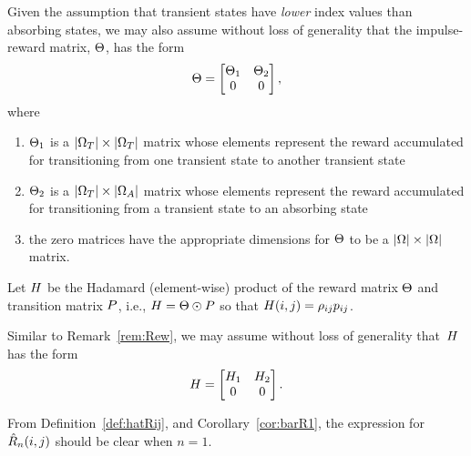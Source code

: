 \begin{remark}
	\label{rem:Rew}
	Given the assumption that transient states have \emph{lower} index values than absorbing states, we may also assume without loss of generality that the impulse-reward matrix, $\Theta$, has the form 
	\begin{equation}
	\label{eq:Rew_sub}
		\Theta = 
			\begin{bmatrix}
				\Theta_{1} & \Theta_{2} \\ 
				0 & 0
			\end{bmatrix},
	\end{equation}
	where 
	\begin{enumerate}
		\item $\Theta_{1}$ is a $|\Omega_{T}| \times |\Omega_{T}|$ matrix whose elements represent the reward accumulated for transitioning from one transient state to another transient state
		\item $\Theta_{2}$ is a $|\Omega_{T}| \times |\Omega_{A}|$ matrix whose elements represent the reward accumulated for transitioning from a transient state to an absorbing state
		\item the zero matrices have the appropriate dimensions for $\Theta$ to be a $|\Omega| \times |\Omega|$ matrix.
	\end{enumerate}
\end{remark}

\begin{mydef}
	\label{def:HtransRew}
	Let $H$ be the Hadamard (element-wise) product of the reward matrix $\Theta$ and transition matrix $P$, i.e., $H = \Theta \odot P$ so that $H(i, j) = \rho_{ij}p_{ij}$.
\end{mydef}

\begin{remark}
	\label{rem:HtransRew}
	Similar to Remark~\ref{rem:Rew}, we may assume without loss of generality that~$H$ has the form 
	\begin{equation}
	\label{eq:HtransRew_sub}
		H = 
			\begin{bmatrix}
				H_{1} & H_{2} \\ 
				0 & 0
			\end{bmatrix}.
	\end{equation}
\end{remark}

From Definition~\ref{def:hatRij}, and Corollary~\ref{cor:barR1}, the expression for $\hat{R}_{n}(i, j)$ should be clear when $n = 1$.

